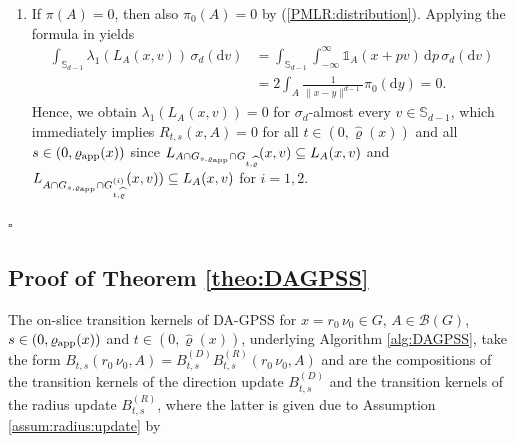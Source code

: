 \documentclass[sn-mathphys-num]{sn-jnl}%
\theoremstyle{thmstyleone}%
\theoremstyle{thmstyletwo}%
\theoremstyle{thmstylethree}%
\newcommand{\rhoapp}{\varrho_{{\rm app}}}
\newcommand{\change}[1]{\bgroup\color{black}#1\egroup}    %
\begin{document}
\begin{appendices}
\begin{enumerate}
    \item If $\pi(A)=0$, then also $\pi_0(A)=0$ by (\ref{PMLR:distribution}). Applying the formula in \citet[Theorem~15.13]{Schilling2005} yields
     \begin{align*}
       \int_{\mathbb{S}_{d-1}} \lambda_1(L_A(x,v)) \, \sigma_d(\mathrm{d}v)  
       & = \int_{\mathbb{S}_{d-1}} \int_{-\infty}^\infty \mathbb{1}_A(x+pv) \, \mathrm{d}p \, \sigma_d(\mathrm{d}v) \\
       & = 2 \int_A \frac{1}{\| x-y \|^{d-1}}\pi_0(\mathrm{d}y)=0.   
     \end{align*}
     Hence, we obtain $\lambda_1(L_A(x,v))=0$ for $\sigma_d$-almost every $v\in\mathbb{S}_{d-1}$, which immediately implies $R_{t,s}(x,A)=0$ for all $t\in(0,\widehat{\varrho}(x))$ and all $s\in(0, \rhoapp(x))$ \change{since $L_{A \cap G_{s,\varrho_{\textmd{app}}}\cap G_{t,\widehat{\varrho}}}(x,v)\subseteq L_A(x,v)$ and $L_{A \cap G_{s,\varrho_{\textmd{app}}}\cap G^{(i)}_{t,\widehat{\varrho}}}(x,v))\subseteq L_A(x,v)$ for $i=1,2$.}
     
\end{enumerate}

\begin{flushright}    
$\square$
\end{flushright}


\subsection{Proof of Theorem \ref{theo:DAGPSS}}
\label{app:DAGPSS}

The on-slice transition kernels of DA-GPSS for $x= r_0 \, \nu_0\in G$, $A\in\mathcal{B}(G)$, $s \in (0, \rhoapp(x))$ and $t \in (0, \widehat{\varrho}(x))$, \change{underlying Algorithm \ref{alg:DAGPSS}}, take the form $B_{t,s}(r_0 \, \nu_0,A)=B^{(D)}_{t,s}B^{(R)}_{t,s}(r_0 \, \nu_0,A)$ and are the compositions of the transition kernels of the direction update $B^{(D)}_{t,s}$ and the transition kernels of the radius update $B^{(R)}_{t,s}$, \change{where the latter is given due to Assumption \ref{assum:radius:update} by}



\end{appendices}
\end{document}
